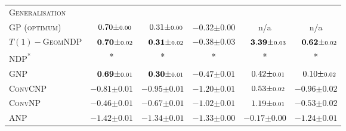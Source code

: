 \begin{table}[h]
\begin{tabular}{lccccc}
		\midrule\multicolumn{6}{l}{\textsc{Generalisation}}                                                                                                                                                                                                                                                          \\[0.5em]
		\scshape GP (optimum)           & $\hphantom{-}0.70 { \pm \scriptstyle 0.00 }$          & $\hphantom{-}0.31 { \pm \scriptstyle 0.00 }$          & $-0.32 { \pm \scriptstyle 0.00 }$          & n/a                                                   & n/a                                                   \\
		\scshape $T(1)-$GeomNDP         & $\hphantom{-}\mathbf{0.70} { \pm \scriptstyle 0.02 }$ & $\hphantom{-}\mathbf{0.31} { \pm \scriptstyle 0.02 }$ & $\mathbf{-0.38} { \pm \scriptstyle 0.03 }$ & $\hphantom{-}\mathbf{3.39} { \pm \scriptstyle 0.03 }$ & $\hphantom{-}\mathbf{0.62} { \pm \scriptstyle 0.02 }$ \\
		\scshape NDP\textsuperscript{*} & *                                                     & *                                                     & *                                          & *                                                     & *                                                     \\
		\scshape GNP                    & $\hphantom{-}\mathbf{0.69} { \pm \scriptstyle 0.01 }$ & $\hphantom{-}\mathbf{0.30} { \pm \scriptstyle 0.01 }$ & $-0.47 { \pm \scriptstyle 0.01 }$          & $\hphantom{-}0.42 { \pm \scriptstyle 0.01 }$          & $\hphantom{-}0.10 { \pm \scriptstyle 0.02 }$          \\
		\scshape ConvCNP                & $-0.81 { \pm \scriptstyle 0.01 }$                     & $-0.95 { \pm \scriptstyle 0.01 }$                     & $-1.20 { \pm \scriptstyle 0.01 }$          & $\hphantom{-}0.53 { \pm \scriptstyle 0.02 }$          & $-0.96 { \pm \scriptstyle 0.02 }$                     \\
		\scshape ConvNP                 & $-0.46 { \pm \scriptstyle 0.01 }$                     & $-0.67 { \pm \scriptstyle 0.01 }$                     & $-1.02 { \pm \scriptstyle 0.01 }$          & $\hphantom{-}1.19 { \pm \scriptstyle 0.01 }$          & $-0.53 { \pm \scriptstyle 0.02 }$                     \\
		\scshape ANP                    & $-1.42 { \pm \scriptstyle 0.01 }$                     & $-1.34 { \pm \scriptstyle 0.01 }$                     & $-1.33 { \pm \scriptstyle 0.00 }$          & $-0.17 { \pm \scriptstyle 0.00 }$                     & $-1.24 { \pm \scriptstyle 0.01 }$                     \\

		\bottomrule
	\end{tabular}
\end{table}


